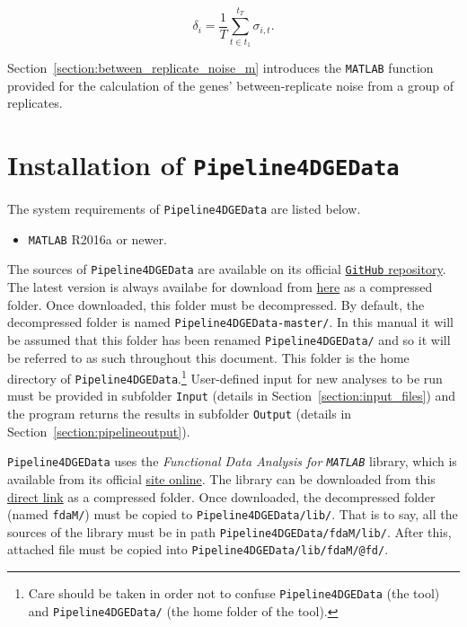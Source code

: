 \documentclass[final,letterpaper,12pt]{article}
\begin{document}
\begin{equation}
\label{equation:between_replicate_noise}
\delta_i = \frac{1}{T} \sum_{t \in t_1}^{t_T} \sigma_{i,t}.
\end{equation}

\par Section~\ref{section:between_replicate_noise_m} introduces the \texttt{MATLAB} function provided for the calculation of the genes' between-replicate noise from a group of replicates.

\section{Installation of \texttt{Pipeline4DGEData}}
\label{section:Installation}

\par The system requirements of \texttt{Pipeline4DGEData} are listed below.

\begin{itemize}

\item \texttt{MATLAB} R2016a or newer.

\end{itemize}

\par The sources of \texttt{Pipeline4DGEData} are available on its official \href{https://github.com/j142857z/Pipeline4DGEData}{\texttt{GitHub} repository}. The latest version is always availabe for download from \href{https://github.com/j142857z/Pipeline4DGEData/archive/master.zip}{here} as a compressed folder. Once downloaded, this folder must be decompressed. By default, the decompressed folder is named \texttt{Pipeline4DGEData-master/}. In this manual it will be assumed that this folder has been renamed \texttt{Pipeline4DGEData/} and so it will be referred to as such throughout this document. This folder is the home directory of \texttt{Pipeline4DGEData}.\footnote{Care should be taken in order not to confuse \texttt{Pipeline4DGEData} (the tool) and \texttt{Pipeline4DGEData/} (the home folder of the tool).} User-defined input for new analyses to be run must be provided in subfolder \texttt{Input} (details in Section~\ref{section:input_files}) and the program returns the results in subfolder \texttt{Output} (details in Section~\ref{section:pipelineoutput}).

\par \texttt{Pipeline4DGEData} uses the \textit{Functional Data Analysis for \texttt{MATLAB}} library, which is available from its official \href{http://www.psych.mcgill.ca/misc/fda/}{site online}. The library can be downloaded from this \href{http://www.psych.mcgill.ca/misc/fda/downloads/FDAfuns/Matlab/fdaMatlab.zip}{direct link} as a compressed folder. Once downloaded, the decompressed folder (named \texttt{fdaM/}) must be copied to \texttt{Pipeline4DGEData/lib/}. That is to say, all the sources of the library must be in path \texttt{Pipeline4DGEData/fdaM/lib/}. After this, attached file   must be copied into \texttt{Pipeline4DGEData/lib/fdaM/@fd/}.
\end{document}
